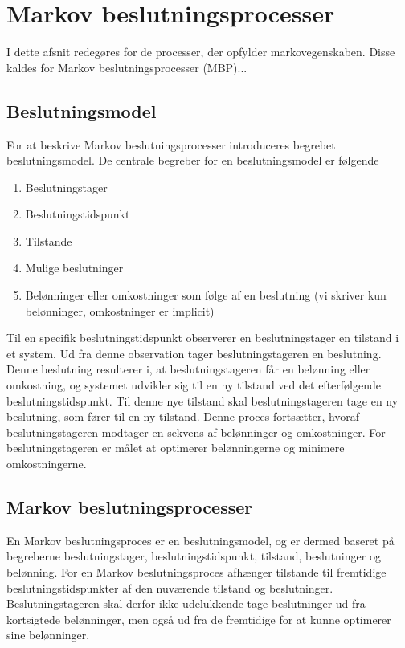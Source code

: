 \chapter{Markov beslutningsprocesser}
I dette afsnit redegøres for de processer, der opfylder markovegenskaben. Disse kaldes for Markov beslutningsprocesser (MBP)...




%


\section{Beslutningsmodel}
For at beskrive Markov beslutningsprocesser introduceres begrebet beslutningsmodel. De centrale begreber for en beslutningsmodel er følgende  
\begin{enumerate}
    \item Beslutningstager
    \item Beslutningstidspunkt
    \item Tilstande
    \item Mulige beslutninger
    \item Belønninger eller omkostninger som følge af en beslutning (vi skriver kun belønninger, omkostninger er implicit)
\end{enumerate}
Til en specifik beslutningstidspunkt observerer en beslutningstager en tilstand i et system. Ud fra denne observation tager beslutningstageren en beslutning. Denne beslutning resulterer i, at beslutningstageren får en belønning eller omkostning, og systemet udvikler sig til en ny tilstand ved det efterfølgende beslutningstidspunkt. Til denne nye tilstand skal beslutningstageren tage en ny beslutning, som fører til en ny tilstand. Denne proces fortsætter, hvoraf beslutningstageren modtager en sekvens af belønninger og omkostninger. For beslutningstageren er målet at optimerer belønningerne og minimere omkostningerne.


\section{Markov beslutningsprocesser}
En Markov beslutningsproces er en beslutningsmodel, og er dermed baseret på begreberne beslutningstager, beslutningstidspunkt, tilstand, beslutninger og belønning. For en Markov beslutningsproces afhænger tilstande til fremtidige beslutningstidspunkter af den nuværende tilstand og beslutninger. Beslutningstageren skal derfor ikke udelukkende tage beslutninger ud fra kortsigtede belønninger, men også ud fra de fremtidige for at kunne optimerer sine belønninger. 


